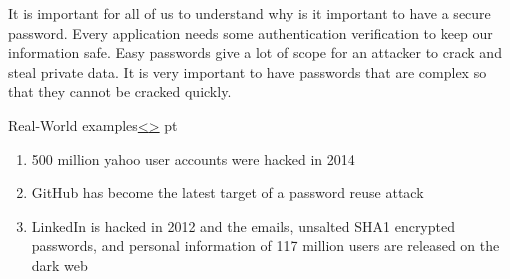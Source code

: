 \documentclass[12pt]{article}
\newenvironment{instructionblock}{\Large\bgroup}{\egroup}
\begin{document}
\vfill

It is important for all of us to understand why is it important to have a secure password. Every application needs some authentication verification to keep our information safe. Easy passwords give a lot of scope for an attacker to crack and steal private data. It is very important to have passwords that are complex so that they cannot be cracked quickly. 



\pagebreak
\begin{slide}{Real-World examples}{\hyperref[slide 1]{\textless}\hyperref[slide 3]{\textgreater}}
 pt
\begin{instructionblock}
\begin{enumerate}
	\item 500 million yahoo user accounts were hacked in 2014 \cite{yahoo}
	\item GitHub has become the latest target of a password reuse attack\cite{github}
	\item LinkedIn is hacked in 2012 and the emails, unsalted SHA1 encrypted passwords, and personal information of 117 million users are released on the dark web \cite{linkedin}
	
\end{enumerate}
\end{instructionblock}
\end{slide}
\vfill
\end{document}
